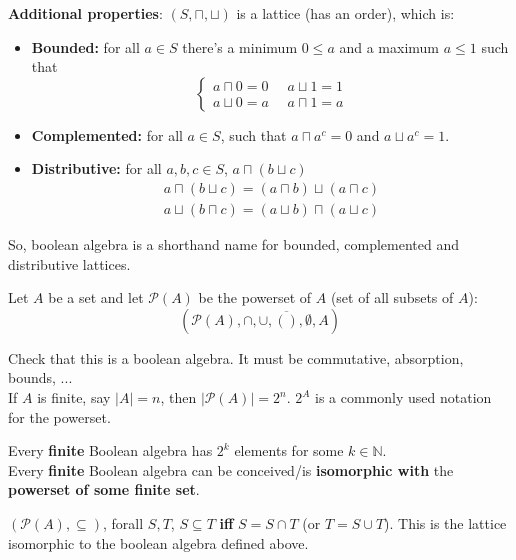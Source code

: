 	\noindent
	\textbf{Additional properties}: $(S, \sqcap, \sqcup)$ is a lattice (has an order), which is:
	\begin{itemize}
		\item \textbf{Bounded:} for all $a \in S$ there's a minimum $0 \leq a$ and a maximum $a \leq 1$ such that
		$$ \begin{cases}
			a \sqcap 0 = 0 \;\; &  a \sqcup 1  = 1 \\
			a \sqcup 0 = a & a \sqcap 1 = a
		\end{cases}$$

		\item \textbf{Complemented:} for all $a \in S$, such that $a \sqcap a^c = 0$ and $a \sqcup a^c = 1$.\\

		\item \textbf{Distributive:} for all $a,b,c \in S$, $a \sqcap (b \sqcup c)$
		$$ \begin{array}{c}
			a \sqcap (b \sqcup c) = (a \sqcap b) \sqcup (a \sqcap c) \\
			a \sqcup (b \sqcap c) = (a \sqcup b) \sqcap (a \sqcup c)
		\end{array}$$
	\end{itemize}

	So, boolean algebra is a shorthand name for bounded, complemented and distributive lattices.\\

	\newpage

	\begin{example} Let $A$ be a set and let $\mathcal{P}(A)$ be the powerset of $A$ (set of all subsets of $A$):
	$$ (\mathcal{P}(A), \cap, \cup, \overline{()}, \emptyset, A) $$

	\noindent
	Check that this is a boolean algebra. It must be commutative, absorption, bounds, ...\\
	If $A$ is finite, say $|A| = n$, then $|\mathcal{P}(A)| = 2^n$. $2^A$ is a commonly used notation for the powerset.
	\end{example}
	\noindent
	Every \textbf{finite} Boolean algebra has $2^k$ elements for some $k \in \mathbb{N}$.\\
	Every \textbf{finite} Boolean algebra can be conceived/is \textbf{isomorphic with} the \textbf{powerset of some finite set}.

	$(\mathcal{P}(A), \subseteq)$, forall $S,T$, $S \subseteq T$ \textbf{iff} $S = S \cap T$ (or $T = S \cup T$). This is the lattice isomorphic to the boolean algebra defined above.


